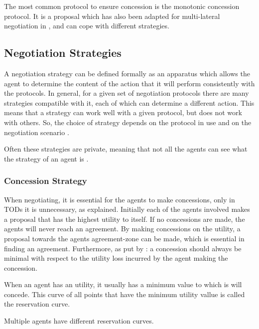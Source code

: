 The most common protocol to ensure concession is the monotonic concession protocol. It is a proposal which has also been adapted for multi-lateral negotiation in \citep{endriss2006monotonic}, and can cope with different strategies.

\subsection{Negotiation Strategies}
A negotiation strategy can be defined formally as an apparatus which allows the agent to determine the content of the action that it will perform consistently with the protocols. In general, for a given set of negotiation protocols there are many strategies compatible with it, each of which can determine a different action. This means that a strategy can work well with a given protocol, but does not work with others. So, the choice of strategy depends on the protocol in use and on the negotiation scenario \citep{di2015multi}.

Often these strategies are private, meaning that not all the agents can see what the strategy of an agent is \citep{fatima2004agenda}. 

\subsubsection{Concession Strategy}
\label{sec:concessionstrat}
When negotiating, it is essential for the agents to make concessions, only in TODs it is unnecessary, as explained. Initially each of the agents involved makes a proposal that has the highest utility to itself. If no concessions are made, the agents will never reach an agreement. By making concessions on the utility, a proposal towards the agents agreement-zone can be made, which is essential in finding an agreement. Furthermore, as put by \citet{endriss2006monotonic}: a concession should always be minimal with respect to the utility loss incurred by the agent making the concession.

\begin{definition*}
	\label{def:rev:agree}
	When an agent has an utility, it usually has a minimum value to which is will concede. This curve of all points that have the minimum utility vallue is called the reservation curve. 
	
	Multiple agents have different reservation curves.
		
\end{definition*}

